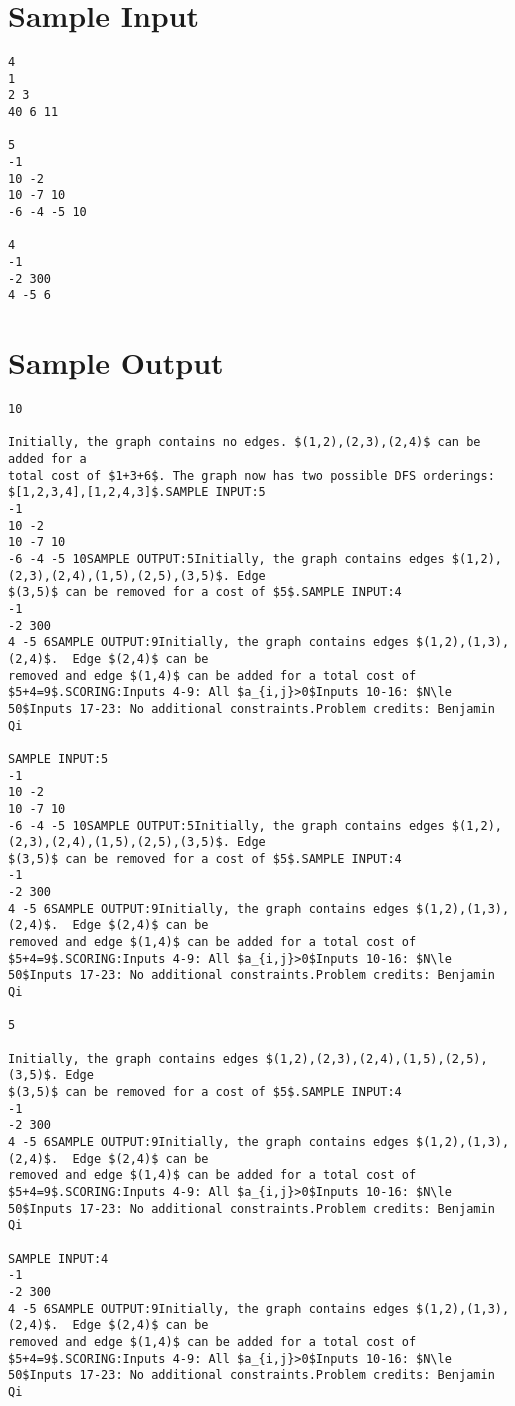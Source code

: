 \documentclass[12pt]{article}
\begin{document}
\section*{Sample Input}
\begin{verbatim}
4
1
2 3
40 6 11

5
-1
10 -2
10 -7 10
-6 -4 -5 10

4
-1
-2 300
4 -5 6
\end{verbatim}

\section*{Sample Output}
\begin{verbatim}
10

Initially, the graph contains no edges. $(1,2),(2,3),(2,4)$ can be added for a
total cost of $1+3+6$. The graph now has two possible DFS orderings:
$[1,2,3,4],[1,2,4,3]$.SAMPLE INPUT:5
-1
10 -2
10 -7 10
-6 -4 -5 10SAMPLE OUTPUT:5Initially, the graph contains edges $(1,2),(2,3),(2,4),(1,5),(2,5),(3,5)$. Edge
$(3,5)$ can be removed for a cost of $5$.SAMPLE INPUT:4
-1
-2 300
4 -5 6SAMPLE OUTPUT:9Initially, the graph contains edges $(1,2),(1,3),(2,4)$.  Edge $(2,4)$ can be
removed and edge $(1,4)$ can be added for a total cost of $5+4=9$.SCORING:Inputs 4-9: All $a_{i,j}>0$Inputs 10-16: $N\le 50$Inputs 17-23: No additional constraints.Problem credits: Benjamin Qi

SAMPLE INPUT:5
-1
10 -2
10 -7 10
-6 -4 -5 10SAMPLE OUTPUT:5Initially, the graph contains edges $(1,2),(2,3),(2,4),(1,5),(2,5),(3,5)$. Edge
$(3,5)$ can be removed for a cost of $5$.SAMPLE INPUT:4
-1
-2 300
4 -5 6SAMPLE OUTPUT:9Initially, the graph contains edges $(1,2),(1,3),(2,4)$.  Edge $(2,4)$ can be
removed and edge $(1,4)$ can be added for a total cost of $5+4=9$.SCORING:Inputs 4-9: All $a_{i,j}>0$Inputs 10-16: $N\le 50$Inputs 17-23: No additional constraints.Problem credits: Benjamin Qi

5

Initially, the graph contains edges $(1,2),(2,3),(2,4),(1,5),(2,5),(3,5)$. Edge
$(3,5)$ can be removed for a cost of $5$.SAMPLE INPUT:4
-1
-2 300
4 -5 6SAMPLE OUTPUT:9Initially, the graph contains edges $(1,2),(1,3),(2,4)$.  Edge $(2,4)$ can be
removed and edge $(1,4)$ can be added for a total cost of $5+4=9$.SCORING:Inputs 4-9: All $a_{i,j}>0$Inputs 10-16: $N\le 50$Inputs 17-23: No additional constraints.Problem credits: Benjamin Qi

SAMPLE INPUT:4
-1
-2 300
4 -5 6SAMPLE OUTPUT:9Initially, the graph contains edges $(1,2),(1,3),(2,4)$.  Edge $(2,4)$ can be
removed and edge $(1,4)$ can be added for a total cost of $5+4=9$.SCORING:Inputs 4-9: All $a_{i,j}>0$Inputs 10-16: $N\le 50$Inputs 17-23: No additional constraints.Problem credits: Benjamin Qi


\end{verbatim}
\end{document}
